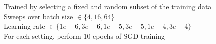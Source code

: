 \documentclass[preview]{standalone}
\begin{document}
Trained by selecting a fixed and random subset of the training data\\Sweeps over batch size $\in \{4, 16, 64\}$\\Learning rate $\in \{1e-6, 3e-6, 1e-5, 3e-5, 1e-4, 3e-4\}$\\For each setting, perform 10 epochs of SGD training\\
\end{document}
